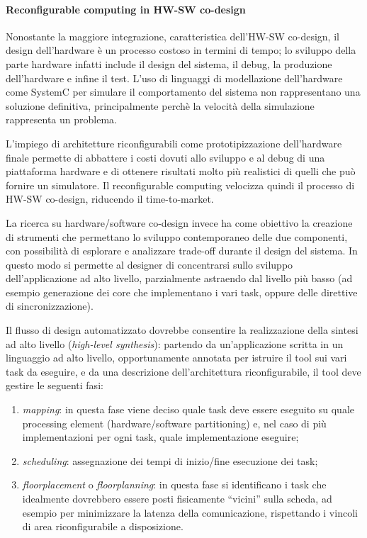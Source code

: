 \paragraph{Reconfigurable computing in HW-SW co-design}
Nonostante la maggiore integrazione, caratteristica dell'HW-SW co-design, il design dell'hardware
è un processo costoso in termini di tempo; lo sviluppo della parte hardware infatti include il
design del sistema, il debug, la produzione dell'hardware e infine il test. L'uso di linguaggi
di modellazione dell'hardware come SystemC \cite{SystemCBook} per simulare il comportamento del
sistema non rappresentano una soluzione definitiva, principalmente perchè la velocità della
simulazione rappresenta un problema.

L'impiego di architetture riconfigurabili come prototipizzazione dell'hardware finale permette
di abbattere i costi dovuti allo sviluppo e al debug di una piattaforma hardware e di ottenere
risultati molto più realistici di quelli che può fornire un simulatore. Il reconfigurable
computing velocizza quindi il processo di HW-SW co-design, riducendo il time-to-market.


La ricerca su \mbox{hardware/software} co-design invece ha come obiettivo la creazione di
strumenti che permettano lo sviluppo contemporaneo delle due componenti, con possibilità di
esplorare e analizzare trade-off durante il design del sistema. In questo modo si permette al 
designer di concentrarsi sullo sviluppo dell'applicazione ad alto livello, parzialmente 
astraendo dal livello più basso (ad esempio generazione dei core che implementano i vari 
task, oppure delle direttive di sincronizzazione).

Il flusso di design automatizzato dovrebbe consentire la realizzazione della sintesi ad 
alto livello (\emph{high-level synthesis}): partendo da un'applicazione scritta in un
linguaggio ad alto livello, opportunamente annotata per istruire il tool sui vari task
da eseguire, e da una descrizione dell'architettura riconfigurabile, il tool deve gestire
le seguenti fasi:
\begin{enumerate}
 \item \emph{mapping}: in questa fase viene deciso quale task deve essere eseguito su 
quale processing 
element (\mbox{hardware/software} partitioning) e, nel caso di più implementazioni per 
ogni task, quale implementazione eseguire;
 \item \emph{scheduling}: assegnazione dei tempi di inizio/fine esecuzione dei task;
 \item \emph{floorplacement} o \emph{floorplanning}: in questa fase si identificano i 
task che idealmente dovrebbero essere posti fisicamente ``vicini'' sulla scheda, ad 
esempio per minimizzare la latenza della comunicazione, rispettando i vincoli di area 
riconfigurabile a disposizione.
\end{enumerate}

